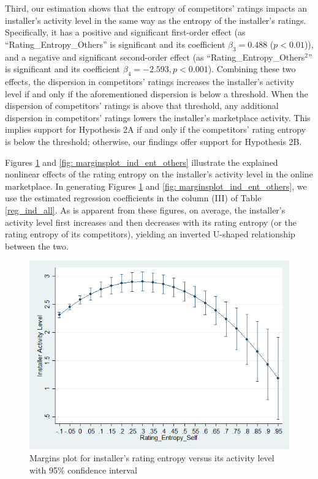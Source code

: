 \documentclass[msom,blindrev]{informs3}
\begin{document}
	Third,  our estimation shows that the entropy of competitors' ratings impacts an installer's activity level in the same way as the entropy of the installer's ratings. Specifically, it has a positive and significant first-order effect (as ``Rating\_Entropy\_Others'' is significant and its coefficient $\beta_{3} =  0.488$ ($p<0.01$)), and a negative and significant second-order effect (as ``Rating\_Entropy\_Others$^{2}$'' is significant and its coefficient $\beta_{4} = -2.593, p<0.001$). Combining these two effects,
	the dispersion in competitors' ratings increases the installer's activity level if and only if the aforementioned dispersion is below a threshold. When the dispersion of competitors' ratings is above that threshold, any additional dispersion in competitors' ratings lowers the installer's marketplace activity. This implies support for Hypothesis 2A if and only if the competitors' rating entropy is below the threshold; otherwise, our findings offer support for Hypothesis 2B.
	
	
	Figures \ref{fig: marginsplot_ind_ent_self} and  \ref{fig: marginsplot_ind_ent_others} illustrate the explained nonlinear effects of the rating entropy on the installer's activity level in the online marketplace. In generating Figures \ref{fig: marginsplot_ind_ent_self} and  \ref{fig: marginsplot_ind_ent_others}, we use the estimated regression coefficients in the column (III) of Table \ref{reg_ind_all}. As is apparent from these figures, on average, the installer's activity level first increases and then decreases with its rating entropy (or the rating entropy of its competitors), yielding an inverted U-shaped relationship between the two.
	
	\begin{figure}
		\centering
		\includegraphics[width=0.7\linewidth]{marginsplot_entself.png}
		\caption{Margins plot for installer's rating entropy versus its activity level with 95\% confidence interval}
		\label{fig: marginsplot_ind_ent_self}
	\end{figure}
	
\end{document}
